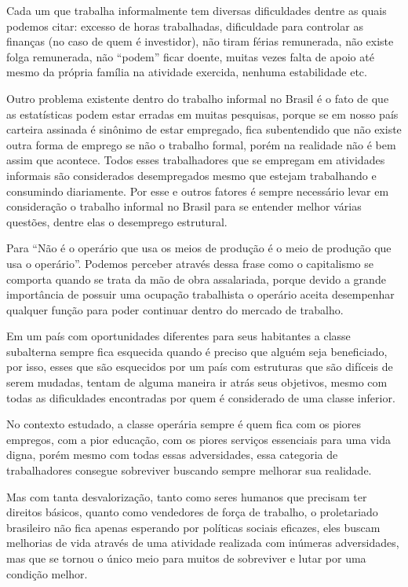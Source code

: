 Cada um que trabalha informalmente tem diversas dificuldades dentre as quais podemos citar: excesso de horas trabalhadas, dificuldade para controlar as finanças (no caso de quem é investidor), não tiram férias remunerada, não existe folga remunerada, não ``podem'' ficar doente, muitas vezes falta de apoio até mesmo da própria família na atividade exercida, nenhuma estabilidade etc.

Outro problema existente dentro do trabalho informal no Brasil é o fato de que as estatísticas podem estar erradas em muitas pesquisas, porque se em nosso país carteira assinada é sinônimo de estar empregado, fica subentendido que não existe outra forma de emprego se não o trabalho formal, porém na realidade não é bem assim que acontece. 
Todos esses trabalhadores que se empregam em atividades informais são considerados desempregados mesmo que estejam trabalhando e consumindo diariamente. Por esse e outros fatores é sempre necessário levar em consideração o trabalho informal no Brasil para se entender melhor várias questões, dentre elas o desemprego estrutural. 

Para \cite{augusta} ``Não é o operário que usa os meios de produção é o meio de produção que usa o operário''. Podemos perceber através dessa frase como o capitalismo se comporta quando se trata da mão de obra assalariada, porque devido a grande importância de possuir uma ocupação trabalhista o operário aceita desempenhar qualquer função para poder continuar dentro do mercado de trabalho.

Em um país com oportunidades diferentes para seus habitantes a classe subalterna sempre fica esquecida quando é preciso que alguém seja beneficiado, por isso, esses que são esquecidos por um país com estruturas que são difíceis de serem mudadas, tentam de alguma maneira ir atrás seus objetivos, mesmo com todas as dificuldades encontradas por quem é considerado de uma classe inferior. 

No contexto estudado, a classe operária sempre é quem fica com os piores empregos, com a pior educação, com os piores serviços essenciais para uma vida digna, porém mesmo com todas essas adversidades, essa categoria de trabalhadores consegue sobreviver buscando sempre melhorar sua realidade.

Mas com tanta desvalorização, tanto como seres humanos que precisam ter direitos básicos, quanto como vendedores de força de trabalho, o proletariado brasileiro não fica apenas esperando por políticas sociais eficazes, eles buscam melhorias de vida através de uma atividade realizada com inúmeras adversidades, mas que se tornou o único meio para muitos de sobreviver e lutar por uma condição melhor.

